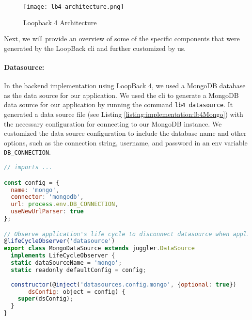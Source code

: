 \begin{figure}[ht]
    \centering
    \texttt{[image: lb4-architecture.png]}
    \caption[Loopback Architecture]{Loopback 4 Architecture\footnotemark[12]}
    \label{implementation:fig:loopbackarchitecture}
\end{figure}
Next, we will provide an overview of some of the specific components that were generated by the LoopBack \ac{cli} and further customized by us.
\paragraph{Datasource:}
In the backend implementation using LoopBack 4, we used a MongoDB database as the data source for our application.
We used the \ac{cli} to generate a MongoDB data source for our application by running the command \texttt{lb4 datasource}. 
It generated a data source file (see Listing \ref{listing:implementation:lb4Mongo}) with the necessary configuration for connecting to our MongoDB instance.
We customized the data source configuration to include the database name and other options, such as the connection string, username, and password in an env variable \texttt{DB\_CONNECTION}.

\begin{lstlisting}[language=JavaScript, caption=The Typescript File for the MongoDB Datasource, label=listing:implementation:lb4Mongo]
// imports ...

const config = {
  name: 'mongo',
  connector: 'mongodb',
  url: process.env.DB_CONNECTION,
  useNewUrlParser: true
};

// Observe application's life cycle to disconnect datasource when application is stopped
@lifeCycleObserver('datasource')
export class MongoDataSource extends juggler.DataSource
  implements LifeCycleObserver {
  static dataSourceName = 'mongo';
  static readonly defaultConfig = config;
    
  constructor(@inject('datasources.config.mongo', {optional: true})
       dsConfig: object = config) {
    super(dsConfig);
  }
}
\end{lstlisting}

